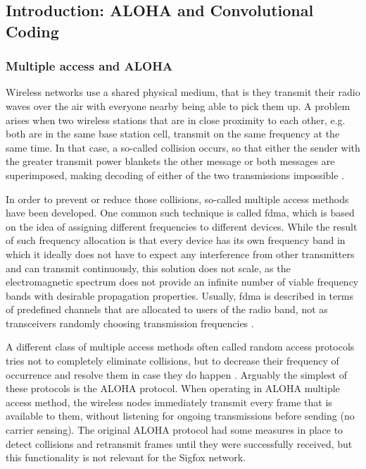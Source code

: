 \subsection{Introduction: ALOHA and Convolutional Coding}
\subsubsection{Multiple access and ALOHA}
Wireless networks use a shared physical medium, that is they transmit their radio waves over the air with everyone nearby being able to pick them up.
A problem arises when two wireless stations that are in close proximity to each other, e.g. both are in the same base station cell, transmit on the same frequency at the same time.
In that case, a so-called collision occurs, so that either the sender with the greater transmit power blankets the other message or both messages are superimposed, making decoding of either of the two transmissions impossible \cite{rfcomm}.

In order to prevent or reduce those collisions, so-called multiple access methods have been developed.
One common such technique is called \gls{fdma}, which is based on the idea of assigning different frequencies to different devices.
While the result of such frequency allocation is that every device has its own frequency band in which it ideally does not have to expect any interference from other transmitters and can transmit continuously, this solution does not scale, as the electromagnetic spectrum does not provide an infinite number of viable frequency bands with desirable propagation properties.
Usually, \gls{fdma} is described in terms of predefined channels that are allocated to users of the radio band, not as transceivers randomly choosing transmission frequencies \cite{rfcomm}.

A different class of multiple access methods often called random access protocols tries not to completely eliminate collisions, but to decrease their frequency of occurrence and resolve them in case they do happen \cite[Section 5.3.2]{kurose}.
Arguably the simplest of these protocols is the ALOHA protocol.
When operating in ALOHA multiple access method, the wireless nodes immediately transmit every frame that is available to them, without listening for ongoing transmissions before sending (no carrier sensing).
The original ALOHA protocol had some measures in place to detect collisions and retransmit frames until they were successfully received, but this functionality is not relevant for the Sigfox network.

